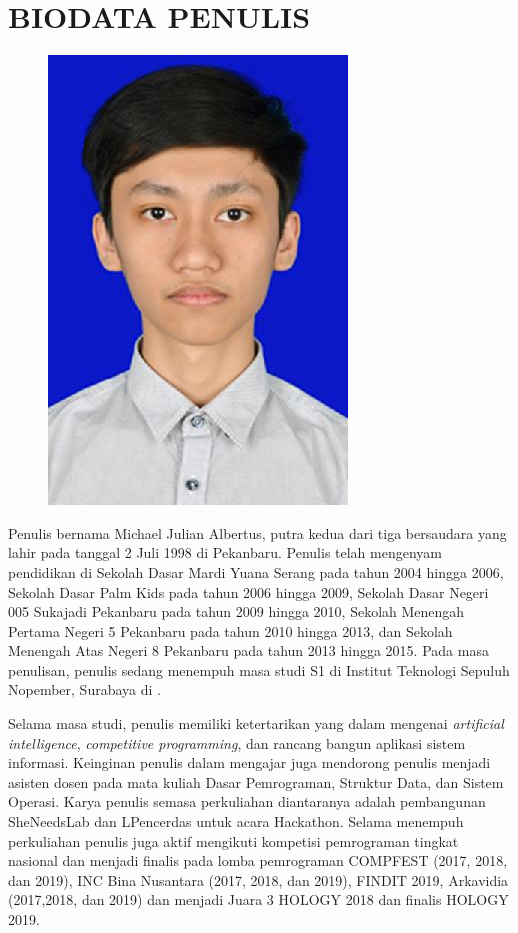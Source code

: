 \chapter{BIODATA PENULIS}

\begin{figure}
	\includegraphics[height=0.3\textheight]{penutup/img/foto.jpeg}
\end{figure}

Penulis bernama Michael Julian Albertus, putra kedua dari tiga bersaudara yang lahir pada tanggal 2 Juli 1998 di Pekanbaru. Penulis telah mengenyam pendidikan di Sekolah Dasar Mardi Yuana Serang pada tahun 2004 hingga 2006, Sekolah Dasar Palm Kids pada tahun 2006 hingga 2009, Sekolah Dasar Negeri 005 Sukajadi Pekanbaru pada tahun 2009 hingga 2010, Sekolah Menengah Pertama Negeri 5 Pekanbaru pada tahun 2010 hingga 2013, dan Sekolah Menengah Atas Negeri 8 Pekanbaru pada tahun 2013 hingga 2015. Pada masa penulisan, penulis sedang menempuh masa studi S1 di Institut Teknologi Sepuluh Nopember, Surabaya di \jurusan.

Selama masa studi, penulis memiliki ketertarikan yang dalam mengenai \textit{artificial intelligence}, \textit{competitive programming}, dan rancang bangun aplikasi sistem informasi. Keinginan penulis dalam mengajar juga mendorong penulis menjadi asisten dosen pada mata kuliah Dasar Pemrograman, Struktur Data, dan Sistem Operasi. Karya penulis semasa perkuliahan diantaranya adalah pembangunan SheNeedsLab dan LPencerdas untuk acara Hackathon. Selama menempuh perkuliahan penulis juga aktif mengikuti kompetisi pemrograman tingkat nasional dan menjadi finalis pada lomba pemrograman COMPFEST (2017, 2018, dan 2019), INC Bina Nusantara (2017, 2018, dan 2019), FINDIT 2019, Arkavidia (2017,2018, dan 2019) dan menjadi Juara 3 HOLOGY 2018 dan finalis HOLOGY 2019.

